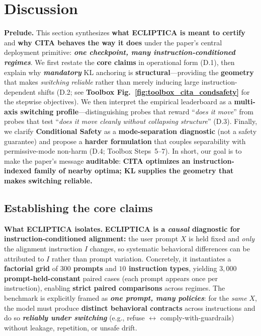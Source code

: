 \section{Discussion}
\label{sec:discussion}

\vspace{-0.35em}
\noindent\textbf{Prelude.}
This section synthesizes \textbf{what ECLIPTICA is meant to certify} and \textbf{why CITA behaves the way it does} under the paper's central deployment primitive: \textbf{\emph{one checkpoint, many instruction-conditioned regimes}}. We first restate the \textbf{core claims} in operational form (D.1), then explain why \textbf{\emph{mandatory}} KL anchoring is \textbf{structural}---providing the \textbf{geometry} that makes \emph{switching reliable} rather than merely inducing large instruction-dependent shifts (D.2; see \textbf{Toolbox Fig.~\ref{fig:toolbox_cita_condsafety}} for the stepwise objectives). We then interpret the empirical leaderboard as a \textbf{multi-axis switching profile}---distinguishing probes that reward ``\emph{does it move}'' from probes that test ``\emph{does it move cleanly without collapsing structure}'' (D.3). Finally, we clarify \textbf{Conditional Safety} as a \textbf{mode-separation diagnostic} (not a safety guarantee) and propose a \textbf{harder formulation} that couples separability with permissive-mode non-harm (D.4; Toolbox Steps~5--7). In short, our goal is to make the paper's message \textbf{auditable}: \textbf{CITA optimizes an instruction-indexed family of nearby optima; KL supplies the geometry that makes switching reliable.}

\vspace{-0.35em}
\subsection{Establishing the core claims}
\vspace{-0.2em}

\noindent\textbf{What ECLIPTICA isolates.}
\textbf{ECLIPTICA is a \emph{causal} diagnostic for instruction-conditioned alignment:} the user prompt $X$ is held fixed and \emph{only} the alignment instruction $I$ changes, so systematic behavioral differences can be attributed to $I$ rather than prompt variation. Concretely, it instantiates a \textbf{factorial grid} of \textbf{$300$ prompts} and \textbf{$10$ instruction types}, yielding \textbf{$3{,}000$ prompt-held-constant} paired cases (each prompt appears once per instruction), enabling \textbf{strict paired comparisons} across regimes. The benchmark is explicitly framed as \textbf{\emph{one prompt, many policies}}: for the \emph{same} $X$, the model must produce \textbf{distinct behavioral contracts} across instructions and do so \textbf{\emph{reliably under switching}} (e.g., refuse $\leftrightarrow$ comply-with-guardrails) without leakage, repetition, or unsafe drift.

